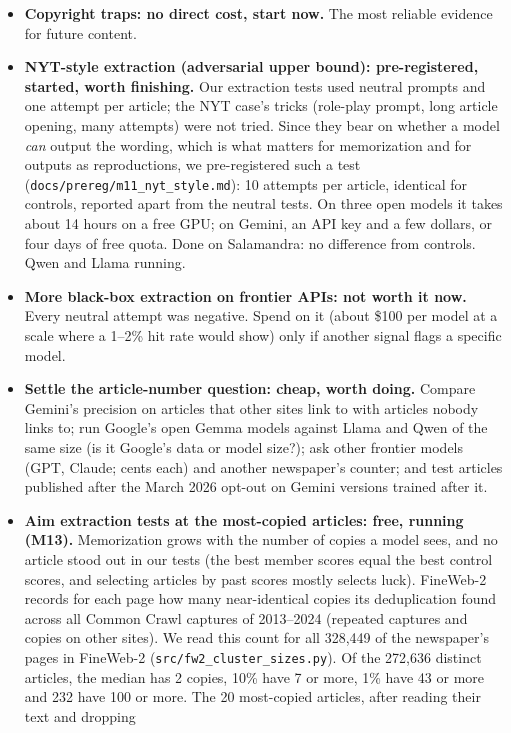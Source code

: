 \documentclass[10pt,a4paper]{article}
\begin{document}
\begin{itemize}
and a separate legal act, not blocked by the current \texttt{robots.txt}. Cost: subscriptions and a protocol agreed
with counsel (recorded sessions).
\item \textbf{Copyright traps: no direct cost, start now.} The most reliable evidence for future content.
\item \textbf{NYT-style extraction (adversarial upper bound): pre-registered, started, worth finishing.} Our extraction
tests used neutral prompts and one attempt per article; the NYT case's tricks (role-play prompt, long article
opening, many attempts) were not tried. Since they bear on whether a model \emph{can} output the wording, which is what
matters for memorization and for outputs as reproductions, we pre-registered such a test
(\texttt{docs/prereg/m11\_nyt\_style.md}): 10 attempts per article, identical for controls, reported apart from the
neutral tests. On three open models it takes about 14 hours on a free GPU; on Gemini, an API key and a few dollars, or
four days of free quota. Done on Salamandra: no difference from controls. Qwen and Llama running.
\item \textbf{More black-box extraction on frontier APIs: not worth it now.} Every neutral attempt was negative. Spend on it
(about \$100 per model at a scale where a 1--2\% hit rate would show) only if another signal flags a specific model.
\item \textbf{Settle the article-number question: cheap, worth doing.} Compare Gemini's precision on articles that
other sites link to with articles nobody links to; run Google's open Gemma models against Llama and Qwen of the same
size (is it Google's data or model size?); ask other frontier models (GPT, Claude; cents each) and another newspaper's
counter; and test articles published after the March 2026 opt-out on Gemini versions trained after it.
\item \textbf{Aim extraction tests at the most-copied articles: free, running (M13).} Memorization grows with the
number of copies a model sees, and no article stood out in our tests (the best member scores equal the best control
scores, and selecting articles by past scores mostly selects luck). FineWeb-2 records for each page how many
near-identical copies its deduplication found across all Common Crawl captures of 2013--2024 (repeated captures and
copies on other sites). We read this count for all 328,449 of the newspaper's pages in FineWeb-2
(\texttt{src/fw2\_cluster\_sizes.py}). Of the 272,636 distinct articles, the median has 2 copies, 10\% have 7 or
more, 1\% have 43 or more and 232 have 100 or more. The 20 most-copied articles, after reading their text and dropping

\end{itemize}
\end{document}
